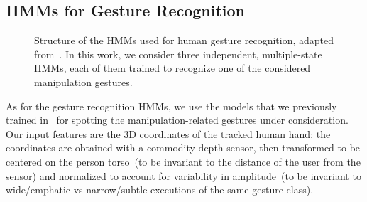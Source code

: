\subsection{\aclp{HMM} for Gesture Recognition}

\newcommand{\myscalefactor}{0.8}

\newcommand{\standardhmm}[1]{
    \node[draw,circle] (hmm#1s1) {1};
    \node[draw,circle, right of=hmm#1s1] (hmm#1s2) {2};
    \node[circle, right of=hmm#1s2] (hmm#1s3) {\dots};
    \node[draw,circle, right of=hmm#1s3] (hmm#1s4) {Q};
    \node[left of=hmm#1s1]  (invisible1) {};
    \node[right of=hmm#1s4] (invisible2) {};
    \path[->] (hmm#1s1) edge (hmm#1s2);
    \path[loop above] (hmm#1s1) edge (hmm#1s1);
    \path[->] (hmm#1s2) edge (hmm#1s3);
    \path[loop above] (hmm#1s2) edge (hmm#1s2);
    \path[dashed] (hmm#1s2) -- (hmm#1s3);
    \path[->] (hmm#1s3) edge (hmm#1s4);
    \path[loop above] (hmm#1s4) edge (hmm#1s4);
    \path[->] (invisible1) edge (hmm#1s1);
    \path[->] (hmm#1s4) edge (invisible2);
}

\newcommand{\modeltwo}{
}

\begin{figure}
  \centering
  \modeltwo
  \caption{Structure of the \acp{HMM} used for human gesture recognition, adapted from~\cite{saponaro:2013:crhri}. In this work, we consider three independent, multiple-state \acp{HMM}, each of them trained to recognize one of the considered manipulation gestures.}
  \label{fig:hmms}
\end{figure}

As for the gesture recognition \acsp{HMM}, we use the models that we previously trained in~\cite{saponaro:2013:crhri} for spotting the manipulation-related gestures under consideration. Our input features are the 3D coordinates of the tracked human hand: the coordinates are obtained with a commodity depth sensor, then transformed to be centered on the person torso~(to be invariant to the distance of the user from the sensor) and normalized to account for variability in amplitude~(to be invariant to wide/emphatic vs narrow/subtle executions of the same gesture class).

